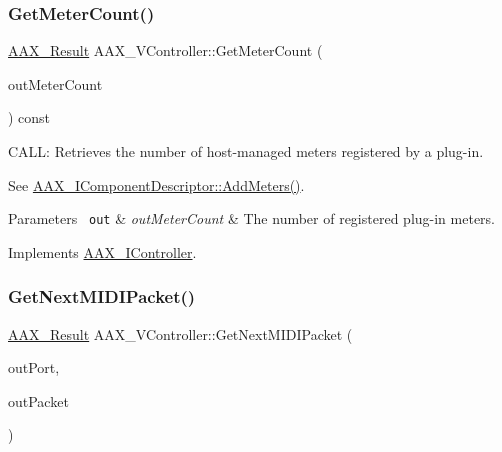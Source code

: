 \mbox{\label{a01905_ac80621fb72de960d43f425d388928c3f}} 
\subsubsection{\texorpdfstring{GetMeterCount()}{GetMeterCount()}}
{\footnotesize\ttfamily \mbox{\hyperlink{a00392_a4d8f69a697df7f70c3a8e9b8ee130d2f}{A\+A\+X\+\_\+\+Result}} A\+A\+X\+\_\+\+V\+Controller\+::\+Get\+Meter\+Count (\begin{DoxyParamCaption}\item[{uint32\+\_\+t $\ast$}]{out\+Meter\+Count }\end{DoxyParamCaption}) const\hspace{0.3cm}{\ttfamily [virtual]}}



C\+A\+LL\+: Retrieves the number of host-\/managed meters registered by a plug-\/in. 

See \mbox{\hyperlink{a01781_a5e4a61afa3d6510891e16d7179bdaa64}{A\+A\+X\+\_\+\+I\+Component\+Descriptor\+::\+Add\+Meters()}}.


\begin{DoxyParams}[1]{Parameters}
\mbox{\texttt{ out}}  & {\em out\+Meter\+Count} & The number of registered plug-\/in meters. \\
\hline
\end{DoxyParams}


Implements \mbox{\hyperlink{a01789_a3ad8e35bb6b51be934696c39a45157e7}{A\+A\+X\+\_\+\+I\+Controller}}.

\mbox{\label{a01905_a4e47302a86a1494ff21d44a024ae0086}} 
\subsubsection{\texorpdfstring{GetNextMIDIPacket()}{GetNextMIDIPacket()}}
{\footnotesize\ttfamily \mbox{\hyperlink{a00392_a4d8f69a697df7f70c3a8e9b8ee130d2f}{A\+A\+X\+\_\+\+Result}} A\+A\+X\+\_\+\+V\+Controller\+::\+Get\+Next\+M\+I\+D\+I\+Packet (\begin{DoxyParamCaption}\item[{\mbox{\hyperlink{a00392_ae807f8986143820cfb5d6da32165c9c7}{A\+A\+X\+\_\+\+C\+Field\+Index}} $\ast$}]{out\+Port,  }\item[{\mbox{\hyperlink{a01429}{A\+A\+X\+\_\+\+C\+Midi\+Packet}} $\ast$}]{out\+Packet }\end{DoxyParamCaption})\hspace{0.3cm}{\ttfamily [virtual]}}



